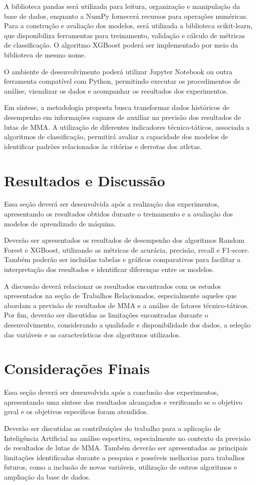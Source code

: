 \documentclass[12pt,a4paper]{report}
\begin{document}
A biblioteca pandas será utilizada para leitura, organização e manipulação da base de dados, enquanto a NumPy fornecerá recursos para operações numéricas. Para a construção e avaliação dos modelos, será utilizada a biblioteca scikit-learn, que disponibiliza ferramentas para treinamento, validação e cálculo de métricas de classificação. O algoritmo XGBoost poderá ser implementado por meio da biblioteca de mesmo nome.

O ambiente de desenvolvimento poderá utilizar Jupyter Notebook ou outra ferramenta compatível com Python, permitindo executar os procedimentos de análise, visualizar os dados e acompanhar os resultados dos experimentos.

Em síntese, a metodologia proposta busca transformar dados históricos de desempenho em informações capazes de auxiliar na previsão dos resultados de lutas de MMA. A utilização de diferentes indicadores técnico-táticos, associada a algoritmos de classificação, permitirá avaliar a capacidade dos modelos de identificar padrões relacionados às vitórias e derrotas dos atletas.

\chapter{Resultados e Discussão}

Essa seção deverá ser desenvolvida após a realização dos experimentos, apresentando os resultados obtidos durante o treinamento e a avaliação dos modelos de aprendizado de máquina.

Deverão ser apresentados os resultados de desempenho dos algoritmos Random Forest e XGBoost, utilizando as métricas de acurácia, precisão, recall e F1-score. Também poderão ser incluídas tabelas e gráficos comparativos para facilitar a interpretação dos resultados e identificar diferenças entre os modelos.

A discussão deverá relacionar os resultados encontrados com os estudos apresentados na seção de Trabalhos Relacionados, especialmente aqueles que abordam a previsão de resultados de MMA e a análise de fatores técnico-táticos. Por fim, deverão ser discutidas as limitações encontradas durante o desenvolvimento, considerando a qualidade e disponibilidade dos dados, a seleção das variáveis e as características dos algoritmos utilizados.

\chapter{Considerações Finais}

Essa seção deverá ser desenvolvida após a conclusão dos experimentos, apresentando uma síntese dos resultados alcançados e verificando se o objetivo geral e os objetivos específicos foram atendidos.

Deverão ser discutidas as contribuições do trabalho para a aplicação de Inteligência Artificial na análise esportiva, especialmente no contexto da previsão de resultados de lutas de MMA. Também deverão ser apresentadas as principais limitações identificadas durante a pesquisa e possíveis melhorias para trabalhos futuros, como a inclusão de novas variáveis, utilização de outros algoritmos e ampliação da base de dados.
\end{document}
